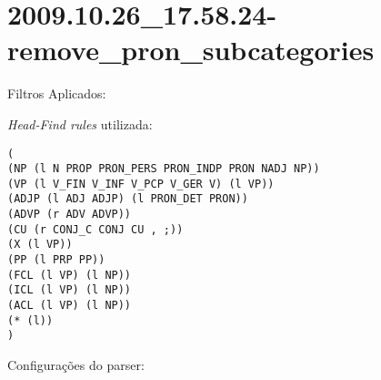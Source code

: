 \section{2009.10.26_17.58.24-remove_pron_subcategories} %
\label{sec:exp:2009.10.26_17.58.24-remove_pron_subcategories}

Filtros Aplicados:

\begin{itemize}
  
  \item{\emph{RemovePronSubcategories}
  
\end{itemize}

\emph{Head-Find rules} utilizada:

\scriptsize
\begin{verbatim}
(
(NP (l N PROP PRON_PERS PRON_INDP PRON NADJ NP))
(VP (l V_FIN V_INF V_PCP V_GER V) (l VP))
(ADJP (l ADJ ADJP) (l PRON_DET PRON))
(ADVP (r ADV ADVP))
(CU (r CONJ_C CONJ CU , ;))
(X (l VP))
(PP (l PRP PP))
(FCL (l VP) (l NP))
(ICL (l VP) (l NP))
(ACL (l VP) (l NP))
(* (l))
)

\end{verbatim}

\normalsize

Configurações do parser:


